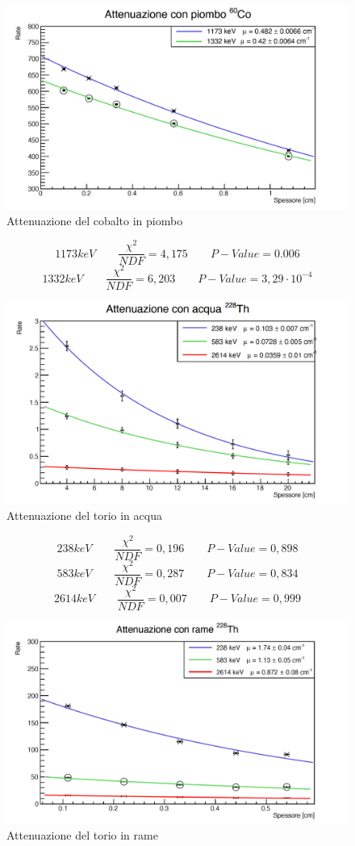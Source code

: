 \documentclass[a4paper,10pt]{article}
\begin{document}
\begin{figure}[H]
    \centering
    \includegraphics[scale=0.45]{grafici/attenuazionecobaltopiombo}
    \caption{Attenuazione del cobalto in piombo}
\end{figure}
$$
	1173 keV \qquad \frac{\chi^2}{NDF}  = 4,175 \qquad P-Value = 0.006
$$
$$
	1332 keV \qquad \frac{\chi^2}{NDF}  = 6,203 \qquad P-Value = 3,29\cdot 10^{-4}
$$
\begin{figure}[H]
    \centering
    \includegraphics[scale=0.45]{grafici/attenuazionetorioacqua}
    \caption{Attenuazione del torio in acqua}
\end{figure}
$$
	238 keV \qquad \frac{\chi^2}{NDF}  = 0,196 \qquad P-Value = 0,898
$$
$$
	583 keV \qquad \frac{\chi^2}{NDF}  = 0,287 \qquad P-Value = 0,834
$$
$$
	2614 keV \qquad \frac{\chi^2}{NDF}  = 0,007 \qquad P-Value = 0,999
$$
\begin{figure}[H]
    \centering
    \includegraphics[scale=0.45]{grafici/attenuazionetoriorame}
    \caption{Attenuazione del torio in rame}
\end{figure}
\end{document}
